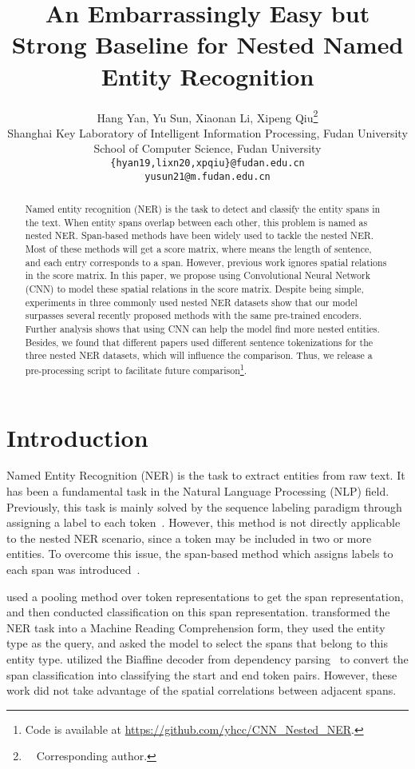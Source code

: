 \documentclass[11pt]{article}
\title{An Embarrassingly Easy but Strong Baseline for Nested Named Entity Recognition}
\author{Hang Yan, Yu Sun, Xiaonan Li, Xipeng Qiu\thanks{\ \  Corresponding author.}\\
  Shanghai Key Laboratory of Intelligent Information Processing, Fudan University \\
  School of Computer Science, Fudan University \\
  \texttt{\{hyan19,lixn20,xpqiu\}@fudan.edu.cn}\\
  \texttt{yusun21@m.fudan.edu.cn}\\}
\begin{document}
\maketitle
\begin{abstract}
  Named entity recognition (NER) is the task to detect and classify the entity spans in the text. When entity spans overlap between each other, this problem is named as nested NER. Span-based methods have been widely used to tackle the nested NER. Most of these methods will get a  score  matrix, where  means the length of sentence, and each entry corresponds to a span. However, previous work ignores spatial relations in the score matrix. In this paper, we propose using Convolutional Neural Network (CNN) to model these spatial relations in the score matrix. Despite being simple, experiments in three commonly used nested NER datasets show that our model surpasses several recently proposed methods with the same pre-trained encoders. Further analysis shows that using CNN can help the model find more nested entities. Besides, we found that different papers used different sentence tokenizations for the three nested NER datasets, which will influence the comparison. Thus, we release a pre-processing script to facilitate future comparison\footnote{Code is available at \url{https://github.com/yhcc/CNN_Nested_NER}.}.
\end{abstract}

\section{Introduction} 




Named Entity Recognition (NER) is the task to extract entities from raw text. 
It has been a fundamental task in the Natural Language Processing (NLP) field. Previously, this task is mainly solved by the sequence labeling paradigm   
through assigning a label to each token~\cite{DBLP:journals/corr/HuangXY15,DBLP:conf/acl/MaH16,DBLP:journals/corr/abs-1911-04474}. However, this method is not directly applicable to the nested NER scenario, since a token may be included in two or more entities. To overcome this issue, the span-based method which assigns labels to each span was introduced~\cite{DBLP:conf/ecai/EbertsU20,DBLP:conf/acl/LiFMHWL20,DBLP:conf/acl/YuBP20}. 

\citet{DBLP:conf/ecai/EbertsU20} used a pooling method over token representations to get the span representation, and then conducted classification on this span representation. \citet{DBLP:conf/acl/LiFMHWL20} transformed the NER task into a Machine Reading Comprehension form, they used the entity type as the query, and asked the model to select the spans that belong to this entity type. \citet{DBLP:conf/acl/YuBP20} utilized the Biaffine decoder from dependency parsing~\cite{DBLP:conf/iclr/DozatM17} to convert the span classification into classifying the start and end token pairs. However, these work did not take advantage of the spatial correlations between adjacent spans. 
\end{document}
